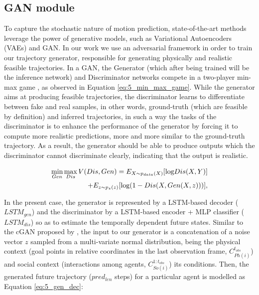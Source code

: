 \subsection{GAN module}
\label{subsec:5_gan_module}

To capture the stochastic nature of motion prediction, state-of-the-art methods leverage the power of generative models, such as Variational Autoencoders (VAEs) and \acf{GAN}. In our work we use an adversarial framework in order to train our trajectory generator, responsible for generating physically and realistic feasible trajectories. In a \ac{GAN}, the Generator (which after being trained will be the inference network) and Discriminator networks compete in a two-player min-max game \cite{goodfellow2020generative}, as observed in Equation \ref{eq:5_min_max_game}. While the generator aims at producing feasible trajectories, the discriminator learns to differentiate between fake and real samples, in other words, ground-truth (which are feasible by definition) and inferred trajectories, in such a way the tasks of the discriminator is to enhance the performance of the generator by forcing it to compute more realistic predictions, more and more similar to the ground-truth trajectory. As a result, the generator should be able to produce outputs which the discriminator cannot discriminate clearly, indicating that the output is realistic. 

\begin{eqnarray}
	\label{eq:5_min_max_game}
	&&\hspace{-10mm} \min_{Gen} \max_{Dis} V(Dis, Gen)=E_{X \sim p_{data}(X)}[\mbox{log} Dis(X,Y)] \nonumber \\
	&&\hspace{15mm} + E_{z \sim p_z(z)}[\mbox{log} (1 - Dis(X, Gen(X,z)))],
\end{eqnarray}

In the present case, the generator is represented by a \ac{LSTM}-based decoder ($LSTM_{gen}$) and the discriminator by a \ac{LSTM}-based encoder + \ac{MLP} classifier  ($LSTM_{dis}$) so as to estimate the temporally dependent future states. Similar to the \ac{cGAN} proposed by \cite{sadeghian2019sophie}, the input to our generator is a concatenation of a noise vector $z$ sampled from a multi-variate normal distribution, being the physical context (goal points in relative coordinates in the last observation frame, $C_{Ph(i)}^{t_{obs}}$) and social context (interactions among agents, $C_{So(i)}^{1:t_{obs}}$) its conditions. Then, the generated future trajectory ($pred_{len}$ steps) for a particular agent is modelled as Equation \ref{eq:5_gen_dec}:

